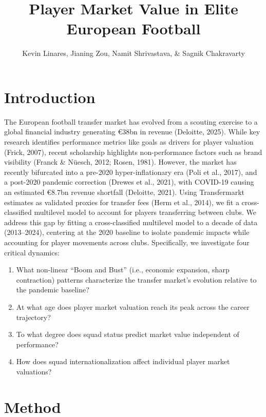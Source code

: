 \documentclass[
  12pt,
]{article}
\title{Player Market Value in Elite European Football}
\author{Kevin Linares, Jianing Zou, Namit Shrivastava, \& Sagnik
Chakravarty}
\date{}
\providecommand{\tightlist}{%
  \setlength{\itemsep}{0pt}\setlength{\parskip}{0pt}}\usepackage{longtable,booktabs,array}
\begin{document}
\maketitle


\vspace{-1.5cm}

\section{Introduction}\label{introduction}

The European football transfer market has evolved from a scouting
exercise to a global financial industry generating €38bn in revenue
(Deloitte, 2025). While key research identifies performance metrics like
goals as drivers for player valuation (Frick, 2007), recent scholarship
highlights non-performance factors such as brand visibility (Franck \&
Nüesch, 2012; Rosen, 1981). However, the market has recently bifurcated
into a pre-2020 hyper-inflationary era (Poli et al., 2017), and a
post-2020 pandemic correction (Drewes et al., 2021), with COVID-19
causing an estimated €8.7bn revenue shortfall (Deloitte, 2021). Using
Transfermarkt estimates as validated proxies for transfer fees (Herm et
al., 2014), we fit a cross-classified multilevel model to account for
players transferring between clubs. We address this gap by fitting a
cross-classified multilevel model to a decade of data (2013--2024),
centering at the 2020 baseline to isolate pandemic impacts while
accounting for player movements across clubs. Specifically, we
investigate four critical dynamics:

\begin{enumerate}
\def\labelenumi{\arabic{enumi}.}
\tightlist
\item
  What non-linear ``Boom and Bust'' (i.e., economic expansion, sharp
  contraction) patterns characterize the transfer market's evolution
  relative to the pandemic baseline?
\item
  At what age does player market valuation reach its peak across the
  career trajectory?
\item
  To what degree does squad status predict market value independent of
  performance?
\item
  How does squad internationalization affect individual player market
  valuations?
\end{enumerate}

\section{Method}\label{method}
\end{document}
